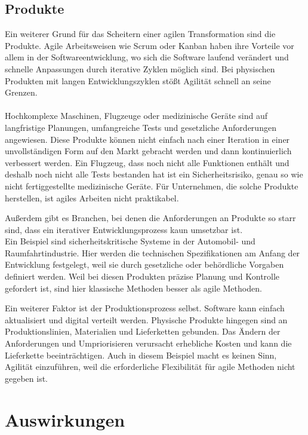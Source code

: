 \documentclass[ngerman]{seminarvorlage}
\begin{document}
\subsection{Produkte}

Ein weiterer Grund für das Scheitern einer agilen Transformation sind die Produkte. Agile Arbeitsweisen wie Scrum oder Kanban haben ihre Vorteile vor allem in der Softwareentwicklung, wo sich die Software laufend verändert und schnelle Anpassungen durch iterative Zyklen möglich sind. Bei physischen Produkten mit langen Entwicklungszyklen stößt Agilität schnell an seine Grenzen\cite{Simons.2021}.\\\\
Hochkomplexe Maschinen, Flugzeuge oder medizinische Geräte sind auf langfristige Planungen, umfangreiche Tests und gesetzliche Anforderungen angewiesen. Diese Produkte können nicht einfach nach einer Iteration in einer unvollständigen Form auf den Markt gebracht werden und dann kontinuierlich verbessert werden. Ein Flugzeug, dass noch nicht alle Funktionen enthält und deshalb noch nicht alle Tests bestanden hat ist ein Sicherheitsrisiko, genau so wie nicht fertiggestellte medizinische Geräte. Für Unternehmen, die solche Produkte herstellen, ist agiles Arbeiten nicht praktikabel.

Außerdem gibt es Branchen, bei denen die Anforderungen an Produkte so starr sind, dass ein iterativer Entwicklungsprozess kaun umsetzbar ist.\\ Ein Beispiel sind sicherheitskritische Systeme in der Automobil- und Raumfahrtindustrie. Hier werden die technischen Spezifikationen am Anfang der Entwicklung festgelegt, weil sie durch gesetzliche oder behördliche Vorgaben definiert werden. Weil bei diesen Produkten präzise Planung und Kontrolle gefordert ist, sind hier klassische Methoden besser als agile Methoden.

Ein weiterer Faktor ist der Produktionsprozess selbst. Software kann einfach aktualisiert und digital verteilt werden. Physische Produkte hingegen sind an Produktionslinien, Materialien und Lieferketten gebunden. Das Ändern der Anforderungen und Umpriorisieren verursacht erhebliche Kosten und kann die Lieferkette beeinträchtigen. Auch in diesem Beispiel macht es keinen Sinn, Agilität einzuführen, weil die erforderliche Flexibilität für agile Methoden nicht gegeben ist.





\section{Auswirkungen}
\end{document}
